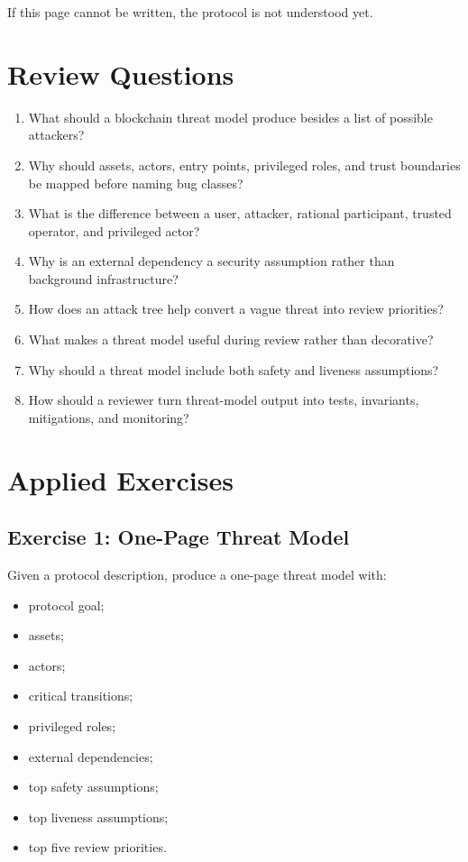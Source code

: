 If this page cannot be written, the protocol is not understood yet.

\section{Review Questions}

\begin{enumerate}
\def\labelenumi{\arabic{enumi}.}
\tightlist
\item
  What should a blockchain threat model produce besides a list of possible attackers?
\item
  Why should assets, actors, entry points, privileged roles, and trust boundaries be mapped before naming bug classes?
\item
  What is the difference between a user, attacker, rational participant, trusted operator, and privileged actor?
\item
  Why is an external dependency a security assumption rather than background infrastructure?
\item
  How does an attack tree help convert a vague threat into review priorities?
\item
  What makes a threat model useful during review rather than decorative?
\item
  Why should a threat model include both safety and liveness assumptions?
\item
  How should a reviewer turn threat-model output into tests, invariants, mitigations, and monitoring?
\end{enumerate}

\section{Applied Exercises}

\subsection{Exercise 1: One-Page Threat Model}

Given a protocol description, produce a one-page threat model with:

\begin{itemize}
\tightlist
\item
  protocol goal;
\item
  assets;
\item
  actors;
\item
  critical transitions;
\item
  privileged roles;
\item
  external dependencies;
\item
  top safety assumptions;
\item
  top liveness assumptions;
\item
  top five review priorities.
\end{itemize}

